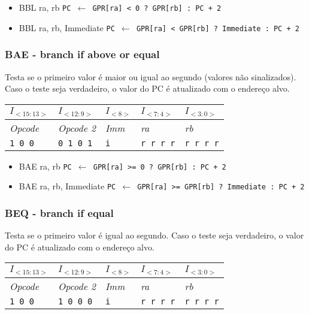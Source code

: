 \documentclass[11pt,a4paper]{report}
\begin{document}
\begin{itemize}
\item BBL ra, rb
\subitem \texttt{PC $\leftarrow$ GPR[ra] < 0 ? GPR[rb] : PC + 2}
\item BBL ra, rb, Immediate
\subitem \texttt{PC $\leftarrow$ GPR[ra] < GPR[rb] ? Immediate :  PC + 2}
\end{itemize}

\subsubsection{BAE - branch if above or equal}
Testa se o primeiro valor é maior ou igual ao segundo (valores não
sinalizados). Caso o teste seja verdadeiro, o valor do PC é atualizado
com o endereço alvo.

\begin{table}[htb!]
\centering
\begin{tabular}{|p{2cm}|p{2cm}|p{2cm}|p{2cm}|p{2cm}|}
\hline
$I_{<15:13>}$ & $I_{<12:9>}$ & $I_{<8>}$ & $I_{<7:4>}$ & $I_{<3:0>}$  \\ \hline
\textit{Opcode} & \textit{Opcode 2} & \textit{Imm} & \textit{ra} & \textit{rb} \\ \hline
\texttt{1 0 0} & \texttt{0 1 0 1} & \texttt{i} & \texttt{r r r r} & \texttt{r r r r} \\ \hline
\end{tabular}
\end{table}

\begin{itemize}
\item BAE ra, rb
\subitem \texttt{PC $\leftarrow$ GPR[ra] >= 0 ? GPR[rb] : PC + 2}
\item BAE ra, rb, Immediate
\subitem \texttt{PC $\leftarrow$ GPR[ra] >= GPR[rb] ? Immediate :  PC + 2}
\end{itemize}

\subsubsection{BEQ - branch if equal}
Testa se o primeiro valor é igual ao segundo. Caso o teste seja
verdadeiro, o valor do PC é atualizado com o endereço alvo.

\begin{table}[htb!]
\centering
\begin{tabular}{|p{2cm}|p{2cm}|p{2cm}|p{2cm}|p{2cm}|}
\hline
$I_{<15:13>}$ & $I_{<12:9>}$ & $I_{<8>}$ & $I_{<7:4>}$ & $I_{<3:0>}$  \\ \hline
\textit{Opcode} & \textit{Opcode 2} & \textit{Imm} & \textit{ra} & \textit{rb} \\ \hline
\texttt{1 0 0} & \texttt{1 0 0 0} & \texttt{i} & \texttt{r r r r} & \texttt{r r r r} \\ \hline
\end{tabular}
\end{table}
\end{document}
